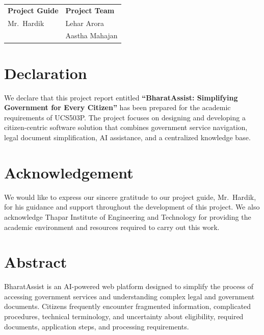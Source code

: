 \documentclass[12pt,a4paper]{report}
\begin{document}
\vspace{1.5cm}

\begin{tabular}{p{6cm}p{6cm}}
\textbf{Project Guide} & \textbf{Project Team} \\[1.2cm]
Mr.\ Hardik & Lehar Arora \\
              & Aastha Mahajan
\end{tabular}

\chapter*{Declaration}

We declare that this project report entitled \textbf{``BharatAssist: Simplifying Government for Every Citizen''} has been prepared for the academic requirements of UCS503P. The project focuses on designing and developing a citizen-centric software solution that combines government service navigation, legal document simplification, AI assistance, and a centralized knowledge base.

\chapter*{Acknowledgement}

We would like to express our sincere gratitude to our project guide, Mr.\ Hardik, for his guidance and support throughout the development of this project. We also acknowledge Thapar Institute of Engineering and Technology for providing the academic environment and resources required to carry out this work.

\chapter*{Abstract}

BharatAssist is an AI-powered web platform designed to simplify the process of accessing government services and understanding complex legal and government documents. Citizens frequently encounter fragmented information, complicated procedures, technical terminology, and uncertainty about eligibility, required documents, application steps, and processing requirements.
\end{document}
